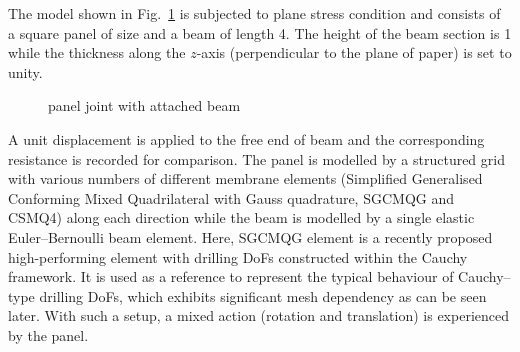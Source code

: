 \documentclass[3p,sort&compress,11pt,fleqn,review]{elsarticle}
\newcommand*{\alert}[1]{#1}
\newcommand*{\figref}[1]{Fig.~\ref{#1}}
\begin{document}
The model shown in \figref{fig:joint_example} is subjected to plane stress condition and consists of a square panel of size  and a beam of length \num{4}. The height of the beam section is \num{1} while the thickness along the $z$-axis \alert{(perpendicular to the plane of paper)} is set to unity.
\begin{figure}[htb]
\centering\footnotesize
{}
\caption{panel joint with attached beam}\label{fig:joint_example}
\end{figure}
A unit displacement is applied to the free end of beam and the corresponding resistance is recorded for comparison. The panel is modelled by a structured grid with various numbers of \alert{different} membrane elements (Simplified Generalised Conforming Mixed Quadrilateral with Gauss quadrature, SGCMQG \citep{Chang2020} and CSMQ4) along each direction while the beam is modelled by a single elastic Euler--Bernoulli beam element. \alert{Here, SGCMQG element is a recently proposed high-performing element with drilling DoFs constructed within the Cauchy framework. It is used as a reference to represent the typical behaviour of Cauchy--type drilling DoFs, which exhibits significant mesh dependency as can be seen later.} With such a setup, a mixed action (rotation and translation) is experienced by the panel.
\end{document}
